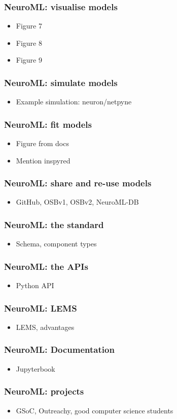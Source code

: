 \begin{frame}[c]
  \frametitle{NeuroML: visualise models}
  \begin{itemize}
    \item Figure 7
    \item Figure 8
    \item Figure 9
  \end{itemize}
\end{frame}
\begin{frame}[c]
  \frametitle{NeuroML: simulate models}
  \begin{itemize}
    \item Example simulation: neuron/netpyne
  \end{itemize}
\end{frame}
\begin{frame}[c]
  \frametitle{NeuroML: fit models}
  \begin{itemize}
    \item Figure from docs
    \item Mention inspyred
  \end{itemize}
\end{frame}
\begin{frame}[c]
  \frametitle{NeuroML: share and re-use models}
  \begin{itemize}
    \item GitHub, OSBv1, OSBv2, NeuroML-DB
  \end{itemize}
\end{frame}
\begin{frame}[c]
  \frametitle{NeuroML: the standard}
  \begin{itemize}
    \item Schema, component types
  \end{itemize}
\end{frame}
\begin{frame}[c]
  \frametitle{NeuroML: the APIs}
  \begin{itemize}
    \item Python API
  \end{itemize}
\end{frame}
\begin{frame}[c]
  \frametitle{NeuroML: LEMS}
  \begin{itemize}
    \item LEMS, advantages
  \end{itemize}
\end{frame}
\begin{frame}[c]
  \frametitle{NeuroML: Documentation}
  \begin{itemize}
    \item Jupyterbook
  \end{itemize}
\end{frame}
\begin{frame}[c]
  \frametitle{NeuroML: projects}
  \begin{itemize}
    \item GSoC, Outreachy, good computer science students
  \end{itemize}
\end{frame}

